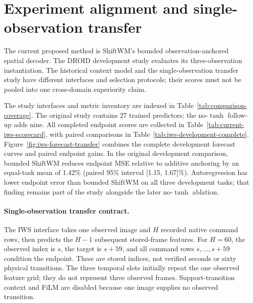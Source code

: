 \section{Experiment alignment and single-observation transfer}
\label{app:experiment-alignment}
The current proposed method is ShiftWM's bounded observation-anchored spatial
decoder. The DROID development study evaluates its three-observation instantiation. The historical
context model and the single-observation transfer study have different
interfaces and selection protocols; their scores must not be pooled into one
cross-domain superiority claim.


The study interfaces and metric inventory are indexed in
Table~\ref{tab:comparison-coverage}. The original study contains 27 trained
predictors; the no-$\tanh$ follow-up adds nine. All completed endpoint scores
are collected in Table~\ref{tab:current-iws-scorecard}, with paired comparisons
in Table~\ref{tab:iws-development-complete}. Figure~\ref{fig:iws-forecast-transfer}
combines the complete development forecast curves and paired endpoint gains.
In the original development comparison, bounded ShiftWM reduces endpoint MSE
relative to additive anchoring by an equal-task mean of 1.42\%
(paired 95\% interval [1.15, 1.67]\%). Autoregression has lower endpoint error
than bounded ShiftWM on all three development tasks; that finding remains
part of the study alongside the later no-$\tanh$ ablation.

\paragraph{Single-observation transfer contract.}
The IWS interface takes one observed image and $H$ recorded native
command rows, then predicts the $H-1$ subsequent stored-frame features.
For $H=60$, the observed index is $s$, the target is $s+59$, and all command
rows $s,\ldots,s+59$ condition the endpoint. These are stored indices, not
verified seconds or sixty physical transitions. The three temporal slots
initially repeat the one observed feature grid; they do not represent three
observed frames. Support-transition context and FiLM are disabled because
one image supplies no observed transition.

